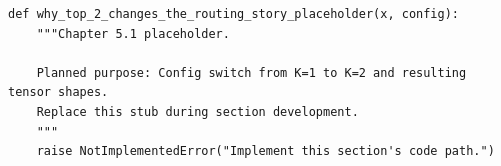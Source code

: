 \begin{lstlisting}[style=bookpython,caption={Planned code placeholder for why top 2 changes the routing story.},label={lst:ch05-why-top-2-changes-the-routing-story}]
def why_top_2_changes_the_routing_story_placeholder(x, config):
    """Chapter 5.1 placeholder.

    Planned purpose: Config switch from K=1 to K=2 and resulting tensor shapes.
    Replace this stub during section development.
    """
    raise NotImplementedError("Implement this section's code path.")
\end{lstlisting}
